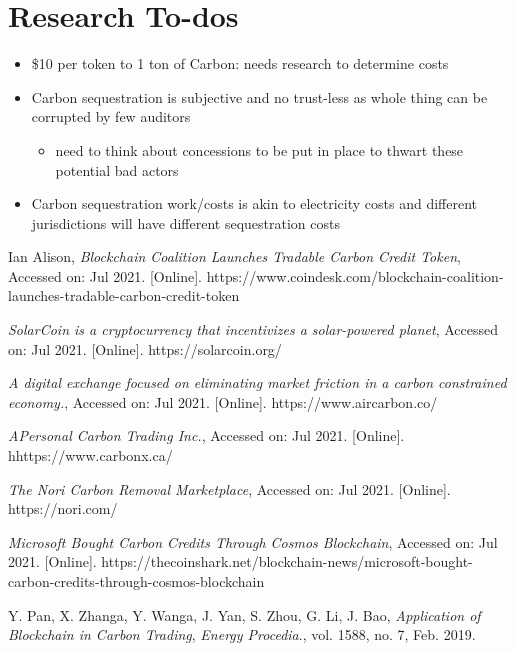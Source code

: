\documentclass{article}
\begin{document}
\section{Research To-dos}

\begin{itemize}
\item \$10 per token to 1 ton of Carbon: needs research to determine costs
\item Carbon sequestration is subjective and no trust-less  as whole thing can be corrupted by few auditors
\begin{itemize}
\item need to think about concessions to be put in place to thwart these potential bad actors
\end{itemize}
\item Carbon sequestration work/costs is akin to electricity costs and different jurisdictions will have different sequestration costs
\end{itemize}


\label{section:summary}

\begin{thebibliography}{1}

 Ian Alison, \textit{Blockchain Coalition Launches Tradable Carbon Credit Token}, Accessed on: Jul 2021. [Online]. https://www.coindesk.com/blockchain-coalition-launches-tradable-carbon-credit-token

 \textit{SolarCoin is a cryptocurrency that incentivizes a solar-powered planet}, Accessed on: Jul 2021. [Online]. https://solarcoin.org/

 \textit{A digital exchange focused on eliminating market friction in a carbon constrained economy.}, Accessed on: Jul 2021. [Online]. https://www.aircarbon.co/

 \textit{APersonal Carbon Trading Inc.}, Accessed on: Jul 2021. [Online]. hhttps://www.carbonx.ca/

 \textit{The Nori Carbon Removal Marketplace}, Accessed on: Jul 2021. [Online]. https://nori.com/

 \textit{Microsoft Bought Carbon Credits Through Cosmos Blockchain}, Accessed on: Jul 2021. [Online]. https://thecoinshark.net/blockchain-news/microsoft-bought-carbon-credits-through-cosmos-blockchain

 Y. Pan, X. Zhanga, Y. Wanga, J. Yan, S. Zhou, G. Li, J. Bao, \textit{Application of Blockchain in Carbon Trading}, \emph{Energy Procedia}., vol. 1588, no. 7, Feb. 2019.

\end{thebibliography}
\end{document}

